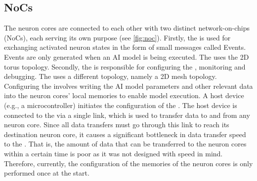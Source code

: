 \subsection{NoCs}
The neuron cores are connected to each other with two distinct network-on-chips (NoCs), each serving its own purpose (see \cref{fig:noc}).
Firstly, the \eventnoc{} is used for exchanging activated neuron states in the form of small messages called Events.
Events are only generated when an AI model is being executed.
The \eventnoc{} uses the 2D torus topology.
Secondly, the \confignoc{} is responsible for configuring the \graicore{}, monitoring and debugging.
The \confignoc{} uses a different topology, namely a 2D mesh topology.
Configuring the \graicore{} involves writing the AI model parameters and other relevant data into the neuron cores' local memories to enable model execution.
A host device (e.g., a microcontroller) initiates the configuration of the \graicore{}.
The host device is connected to the \confignoc{} via a single link, which is used to transfer data to and from any neuron core.
Since all data transfers must go through this link to reach its destination neuron core, it causes a significant bottleneck in data transfer speed to the \graicore{}.
That is, the amount of data that can be transferred to the neuron cores within a certain time is poor as it was not designed with speed in mind.
Therefore, currently, the configuration of the memories of the neuron cores is only performed once at the start.
